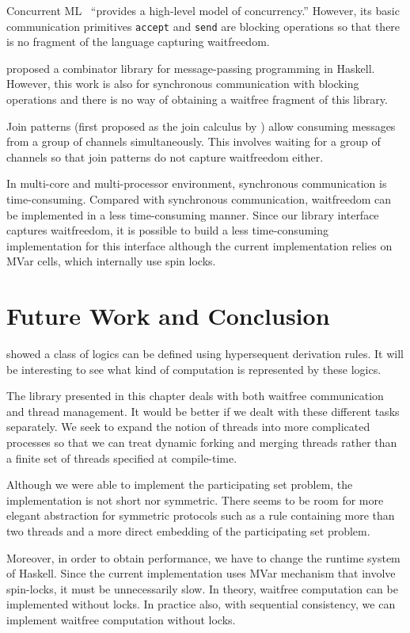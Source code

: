 Concurrent ML~\citep{concurrentML} ``provides a high-level model of
concurrency.''  However, its basic communication primitives
\texttt{accept} and \texttt{send} are blocking operations so that there
is no fragment of the language capturing waitfreedom.

\citet{Brown} proposed a combinator library for message-passing
programming in Haskell.  However, this work is also for synchronous
communication with blocking operations and there is no way of
obtaining a waitfree
fragment of this library.

Join patterns (first proposed as the join calculus by \citet{join}) allow
consuming messages from a group of
channels simultaneously.  This involves waiting for a group of channels
so that join patterns do not capture waitfreedom either.

In multi-core and multi-processor environment, synchronous communication
is time-consuming.  Compared with
synchronous communication, waitfreedom can be implemented in a less
time-consuming manner.  Since our library
interface captures waitfreedom, it is possible to build a less
time-consuming implementation for this interface although the current
implementation relies on MVar cells, which internally use spin locks.

\section{Future Work and Conclusion}

\citet*{alg} showed a class of logics can be defined using
hypersequent derivation rules.  It will be interesting to see what kind
of computation is represented by these logics.

The library presented in this chapter deals with both waitfree
communication and thread management.  It would be better if we dealt with
these different tasks separately.
We seek to expand the notion of threads into more complicated
processes so that we can treat dynamic forking and merging threads rather
than a finite set of threads specified at compile-time.

Although we were able to implement the participating set problem,
the implementation is not short nor symmetric.
There seems to be room for more elegant abstraction for symmetric
protocols such as
a rule containing more than two threads and a more direct embedding of the
participating set problem.

Moreover, in order to obtain performance, we have to change the runtime
system of Haskell.  Since the current implementation uses MVar mechanism
that involve spin-locks, it must be unnecessarily slow.  In theory, waitfree
computation can be implemented without locks.  In practice also, with
sequential consistency, we can implement waitfree computation without
locks.

